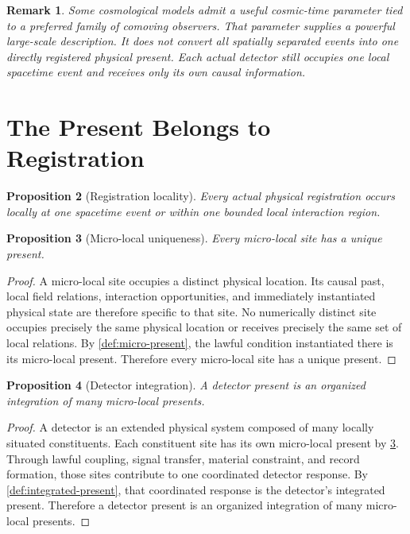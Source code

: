 \documentclass[12pt,onecolumn]{article}
\newtheorem{proposition}{Proposition}[section]
\newtheorem{remark}[proposition]{Remark}
\begin{document}
\begin{remark}
Some cosmological models admit a useful cosmic-time parameter tied to a preferred family of comoving observers. That parameter supplies a powerful large-scale description. It does not convert all spatially separated events into one directly registered physical present. Each actual detector still occupies one local spacetime event and receives only its own causal information.
\end{remark}

\section{The Present Belongs to Registration}

\begin{proposition}[Registration locality]
\label{prop:registration-locality}
Every actual physical registration occurs locally at one spacetime event or within one bounded local interaction region.
\end{proposition}

\begin{proposition}[Micro-local uniqueness]
\label{prop:micro-uniqueness}
Every micro-local site has a unique present.
\end{proposition}

\begin{proof}
A micro-local site occupies a distinct physical location. Its causal past, local field relations, interaction opportunities, and immediately instantiated physical state are therefore specific to that site. No numerically distinct site occupies precisely the same physical location or receives precisely the same set of local relations. By \cref{def:micro-present}, the lawful condition instantiated there is its micro-local present. Therefore every micro-local site has a unique present.
\end{proof}

\begin{proposition}[Detector integration]
\label{prop:detector-integration}
A detector present is an organized integration of many micro-local presents.
\end{proposition}

\begin{proof}
A detector is an extended physical system composed of many locally situated constituents. Each constituent site has its own micro-local present by \cref{prop:micro-uniqueness}. Through lawful coupling, signal transfer, material constraint, and record formation, those sites contribute to one coordinated detector response. By \cref{def:integrated-present}, that coordinated response is the detector's integrated present. Therefore a detector present is an organized integration of many micro-local presents.
\end{proof}
\end{document}
